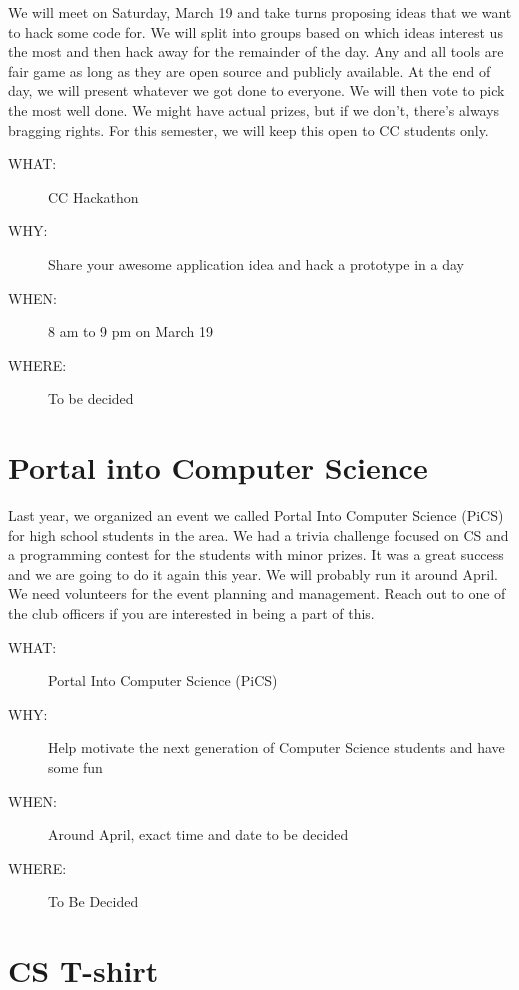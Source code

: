We will meet on Saturday, March 19 and take turns proposing ideas that we want
to hack some code for. We will split into groups based on which ideas interest
us the most and then hack away for the remainder of the day. Any and all tools
are fair game as long as they are open source and publicly available. At the
end of day, we will present whatever we got done to everyone. We will then vote
to pick the most well done. We might have actual prizes, but if we don't,
there's always bragging rights. For this semester, we will keep this open to CC
students only.

\begin{description}
\item[{WHAT:}] CC Hackathon
\item[{WHY:}] Share your awesome application idea and hack a prototype in a day
\item[{WHEN:}] 8 am to 9 pm on March 19
\item[{WHERE:}] To be decided
\end{description}


\newpage


\section{Portal into Computer Science}
\label{sec-9}

Last year, we organized an event we called Portal Into Computer Science (PiCS)
for high school students in the area. We had a trivia challenge focused on CS
and a programming contest for the students with minor prizes. It was a great
success and we are going to do it again this year. We will probably run it
around April. We need volunteers for the event planning and management. Reach
out to one of the club officers if you are interested in being a part of this.

\begin{description}
\item[{WHAT:}] Portal Into Computer Science (PiCS)
\item[{WHY:}] Help motivate the next generation of Computer Science students and have some fun
\item[{WHEN:}] Around April, exact time and date to be decided
\item[{WHERE:}] To Be Decided
\end{description}


\newpage


\section{CS T-shirt}
\label{sec-10}

